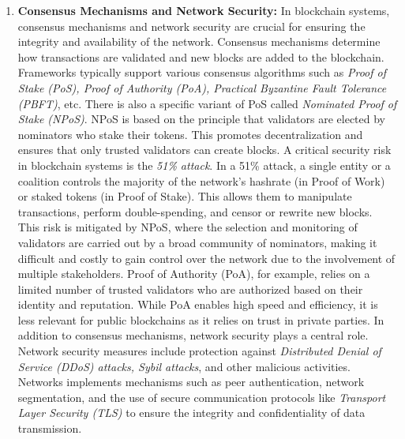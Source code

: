 \begin{enumerate}[label=(\arabic*)]
	\item\textbf{Consensus Mechanisms and Network Security:}
	In blockchain systems, consensus mechanisms and network security are crucial for ensuring the integrity and availability of the network. Consensus mechanisms determine how transactions are validated and new blocks are added to the blockchain. Frameworks typically support various consensus algorithms such as \textit{Proof of Stake (PoS), Proof of Authority (PoA), Practical Byzantine Fault Tolerance (PBFT)}, etc.
	There is also a specific variant of PoS called \textit{Nominated Proof of Stake (NPoS)}. NPoS is based on the principle that validators are elected by nominators who stake their tokens. This promotes decentralization and ensures that only trusted validators can create blocks. A critical security risk in blockchain systems is the \textit{51\% attack}. In a 51\% attack, a single entity or a coalition controls the majority of the network's hashrate (in Proof of Work) or staked tokens (in Proof of Stake). This allows them to manipulate transactions, perform double-spending, and censor or rewrite new blocks. This risk is mitigated by NPoS, where the selection and monitoring of validators are carried out by a broad community of nominators, making it difficult and costly to gain control over the network due to the involvement of multiple stakeholders.
	Proof of Authority (PoA), for example, relies on a limited number of trusted validators who are authorized based on their identity and reputation. While PoA enables high speed and efficiency, it is less relevant for public blockchains as it relies on trust in private parties. 
	In addition to consensus mechanisms, network security plays a central role. Network security measures include protection against \textit{Distributed Denial of Service (DDoS) attacks, Sybil attacks}, and other malicious activities. Networks implements mechanisms such as peer authentication, network segmentation, and the use of secure communication protocols like \textit{Transport Layer Security (TLS)} to ensure the integrity and confidentiality of data transmission.


\end{enumerate}
